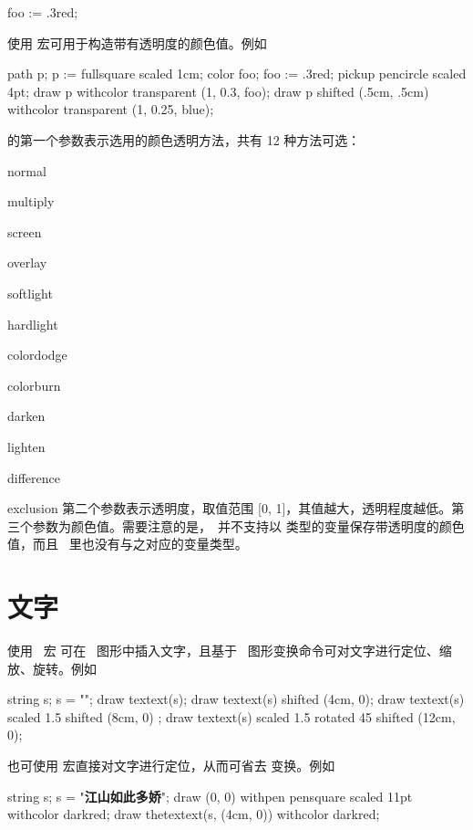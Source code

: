 \starttyping[option=MP]
foo := .3red;
\stoptyping

使用  宏可用于构造带有透明度的颜色值。例如

\startexample
\startMPcode
path p; p := fullsquare scaled 1cm;
color foo; foo := .3red;
pickup pencircle scaled 4pt;
draw p withcolor transparent (1, 0.3, foo);
draw p shifted (.5cm, .5cm) withcolor transparent (1, 0.25, blue);
\stopMPcode
\stopexample
\simpleexample[option=MP]{\getexample}

\noindent {} 的第一个参数表示选用的颜色透明方法，共有 12 种方法可选：

\item normal
\item multiply
\item screen
\item overlay
\item softlight
\item hardlight
\item colordodge
\item colorburn
\item darken
\item lighten
\item difference
\item exclusion
\stopitemize
\noindent 第二个参数表示透明度，取值范围 [0, 1]，其值越大，透明程度越低。第三个参数为颜色值。需要注意的是，\METAPOST\ 并不支持以  类型的变量保存带透明度的颜色值，而且 \METAPOST\ 里也没有与之对应的变量类型。

\section{文字}

使用 \MetaFun\ 宏  可在 \METAPOST\ 图形中插入文字，且基于 \METAPOST\ 图形变换命令可对文字进行定位、缩放、旋转。例如

\startexample
\startMPcode
string s; %
s = "\color[darkred]{\bf 江山如此多娇}";
draw textext(s);
draw textext(s) shifted (4cm, 0);
draw textext(s) scaled 1.5 shifted (8cm, 0) ;
draw textext(s) scaled 1.5 rotated 45 shifted (12cm, 0);
\stopMPcode
\stopexample
\typeexample[option=MP]
\midaligned{\getexample}

也可使用  宏直接对文字进行定位，从而可省去  变换。例如

\startexample
\startMPcode
string s; s = "{\bf 江山如此多娇}";
draw (0, 0) withpen pensquare scaled 11pt withcolor darkred;
draw thetextext(s, (4cm, 0)) withcolor darkred;
\stopMPcode
\stopexample
\typeexample[option=MP]
\getexample

